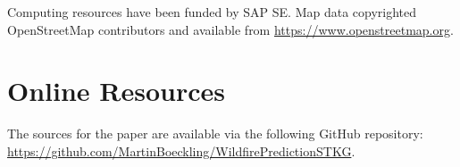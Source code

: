 \documentclass[
]{ceurart}
\begin{document}
\begin{acknowledgments}
	Computing resources have been funded by SAP SE. Map data copyrighted OpenStreetMap contributors and available from \url{https://www.openstreetmap.org}.

\end{acknowledgments}

\printbibliography

\appendix

\section{Online Resources}

The sources for the paper are available via the following GitHub repository: \url{https://github.com/MartinBoeckling/WildfirePredictionSTKG}.
\end{document}
